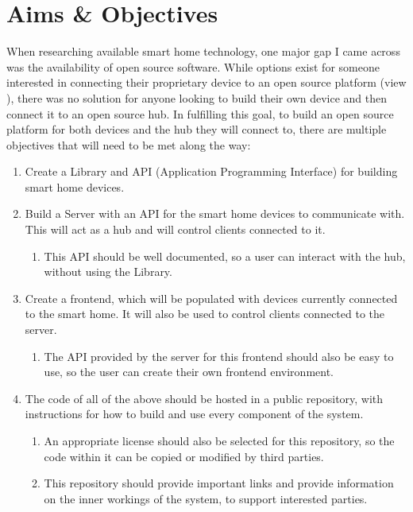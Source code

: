 \section{Aims \& Objectives} \label{sec:intro:aims}
When researching available smart home technology, one major gap I came across 
was the availability of open source software. While options exist for someone 
interested in connecting their proprietary device to an open source platform 
(view ), there was no solution for anyone looking to 
build their own device and then connect it to an open source hub. In fulfilling 
this goal, to build an open source platform for both devices and the hub they 
will connect to, there are multiple objectives that will need to be met along 
the way:
\begin{enumerate}
    \item Create a Library and API (Application Programming Interface) for 
        building smart home devices.
    \item Build a Server with an API for the smart home devices to communicate 
        with. This will act as a hub and will control clients connected to it.
         \begin{enumerate}
             \item This API should be well documented, so a user can interact 
                 with the hub, without using the Library.
         \end{enumerate}
     \item Create a frontend, which will be populated with devices currently 
         connected to the smart home. It will also be used to control clients 
         connected to the server.
         \begin{enumerate}
             \item The API provided by the server for this frontend should also 
                 be easy to use, so the user can create their own frontend 
                 environment.
         \end{enumerate}
     \item The code of all of the above should be hosted in a public repository, 
         with instructions for how to build and use every component of the 
         system.
         \begin{enumerate}
             \item An appropriate license should also be selected for this 
                 repository, so the code within it can be copied or modified by 
                 third parties.
             \item This repository should provide important links and provide 
                 information on the inner workings of the system, to support 
                 interested parties.
         \end{enumerate}
\end{enumerate}
    
